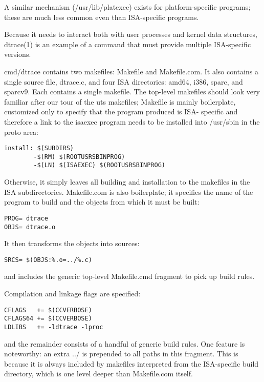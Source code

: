 \documentclass{article}
\begin{document}
A similar mechanism (/usr/lib/platexec) exists for platform-specific programs;
these are much less common even than ISA-specific programs.

Because it needs to interact both with user processes and kernel data
structures, dtrace(1) is an example of a command that must provide multiple
ISA-specific versions.

cmd/dtrace contains two makefiles: Makefile and Makefile.com. It also contains
a single source file, dtrace.c, and four ISA directories: amd64, i386, sparc,
and sparcv9. Each contains a single makefile. The top-level makefiles should
look very familiar after our tour of the uts makefiles; Makefile is mainly
boilerplate, customized only to specify that the program produced is ISA-
specific and therefore a link to the isaexec program needs to be installed into
/usr/sbin in the proto area:
\vspace{0.2cm}

\begin{verbatim}
install: $(SUBDIRS)
        -$(RM) $(ROOTUSRSBINPROG)
        -$(LN) $(ISAEXEC) $(ROOTUSRSBINPROG)
\end{verbatim}

Otherwise, it simply leaves all building and installation to the makefiles in
the ISA subdirectories. Makefile.com is also boilerplate; it specifies the name
of the program to build and the objects from which it must be built:

\begin{verbatim}
PROG= dtrace
OBJS= dtrace.o
\end{verbatim}

It then transforms the objects into sources:

\begin{verbatim}
SRCS= $(OBJS:%.o=../%.c)
\end{verbatim}

and includes the generic top-level Makefile.cmd fragment to pick up build
rules.

\vspace{0.2cm}
Compilation and linkage flags are specified:

\begin{verbatim}
CFLAGS   += $(CCVERBOSE)
CFLAGS64 += $(CCVERBOSE)
LDLIBS   += -ldtrace -lproc
\end{verbatim}

and the remainder consists of a handful of generic build rules. One feature is
noteworthy: an extra ../ is prepended to all paths in this fragment. This is
because it is always included by makefiles interpreted from the ISA-specific
build directory, which is one level deeper than Makefile.com itself.
\end{document}
